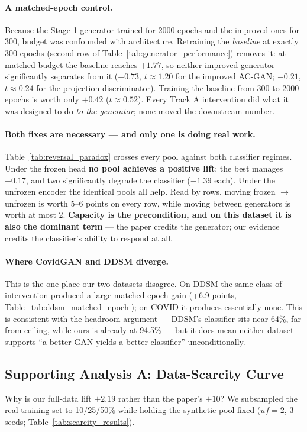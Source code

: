 \documentclass[11pt]{article}
\begin{document}
\paragraph{A matched-epoch control.} Because the Stage-1 generator trained for 2000 epochs and the improved ones for 300, budget was confounded with architecture. Retraining the \emph{baseline} at exactly 300 epochs (second row of Table~\ref{tab:generator_performance}) removes it: at matched budget the baseline reaches $+1.77$, so neither improved generator significantly separates from it ($+0.73$, $t \approx 1.20$ for the improved AC-GAN; $-0.21$, $t \approx 0.24$ for the projection discriminator). Training the baseline from 300 to 2000 epochs is worth only $+0.42$ ($t \approx 0.52$). Every Track A intervention did what it was designed to do \emph{to the generator}; none moved the downstream number.

\paragraph{Both fixes are necessary --- and only one is doing real work.} Table~\ref{tab:reversal_paradox} crosses every pool against both classifier regimes. Under the frozen head \textbf{no pool achieves a positive lift}; the best manages $+0.17$, and two significantly degrade the classifier ($-1.39$ each). Under the unfrozen encoder the identical pools all help. Read by rows, moving frozen $\to$ unfrozen is worth 5--6 points on every row, while moving between generators is worth at most 2. \textbf{Capacity is the precondition, and on this dataset it is also the dominant term} --- the paper credits the generator; our evidence credits the classifier's ability to respond at all.

\paragraph{Where CovidGAN and DDSM diverge.} This is the one place our two datasets disagree. On DDSM the same class of intervention produced a large matched-epoch gain (+6.9 points, Table~\ref{tab:ddsm_matched_epoch}); on COVID it produces essentially none. This is consistent with the headroom argument --- DDSM's classifier sits near 64\%, far from ceiling, while ours is already at 94.5\% --- but it does mean neither dataset supports ``a better GAN yields a better classifier'' unconditionally.

\subsection{Supporting Analysis A: Data-Scarcity Curve}
Why is our full-data lift $+2.19$ rather than the paper's $+10$? We subsampled the real training set to 10/25/50\% while holding the synthetic pool fixed ($uf{=}2$, 3 seeds; Table~\ref{tab:scarcity_results}).
\end{document}
